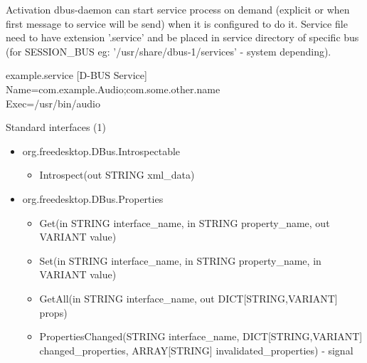 \documentclass{beamer}
\begin{document}
\begin{frame}{Activation}
dbus-daemon can start service process on demand (explicit or when first message to service will be send) when it is configured to do it. Service file need to have extension '.service' and be placed in service directory of specific bus (for SESSION\_BUS eg: '/usr/share/dbus-1/services' - system depending).
\vfill
  \begin{block}{example.service}
  [D-BUS Service]\\
  Name=com.example.Audio;com.some.other.name\\
  Exec=/usr/bin/audio\\
  \end{block}
\end{frame}

\begin{frame}{Standard interfaces (1)}
  \begin{itemize}
    \item org.freedesktop.DBus.Introspectable
    \begin{itemize}
      \item Introspect(out STRING xml\_data)
    \end{itemize}
    \item org.freedesktop.DBus.Properties
    \begin{itemize}
      \item Get(in STRING interface\_name, in STRING property\_name, out VARIANT value)
      \item Set(in STRING interface\_name, in STRING property\_name, in VARIANT value)
      \item GetAll(in STRING interface\_name, out DICT[STRING,VARIANT] props)
      \item PropertiesChanged(STRING interface\_name, DICT[STRING,VARIANT] changed\_properties, ARRAY[STRING] invalidated\_properties) - signal
    \end{itemize}
  \end{itemize}
\end{frame}
\end{document}
